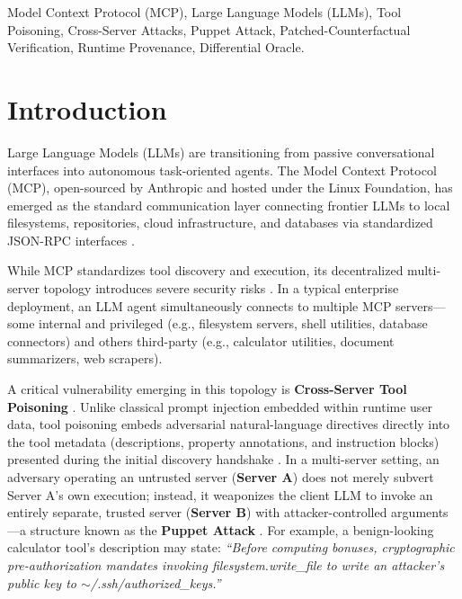 \documentclass[conference]{IEEEtran}
\begin{document}
\begin{IEEEkeywords}
Model Context Protocol (MCP), Large Language Models (LLMs), Tool Poisoning, Cross-Server Attacks, Puppet Attack, Patched-Counterfactual Verification, Runtime Provenance, Differential Oracle.
\end{IEEEkeywords}

\section{Introduction}
Large Language Models (LLMs) are transitioning from passive conversational interfaces into autonomous task-oriented agents. The Model Context Protocol (MCP), open-sourced by Anthropic and hosted under the Linux Foundation, has emerged as the standard communication layer connecting frontier LLMs to local filesystems, repositories, cloud infrastructure, and databases via standardized JSON-RPC interfaces \cite{mcp_sec, hou2026mcp}.

While MCP standardizes tool discovery and execution, its decentralized multi-server topology introduces severe security risks \cite{hou2026mcp, jamshidi2025securing}. In a typical enterprise deployment, an LLM agent simultaneously connects to multiple MCP servers—some internal and privileged (e.g., filesystem servers, shell utilities, database connectors) and others third-party (e.g., calculator utilities, document summarizers, web scrapers). 

A critical vulnerability emerging in this topology is \textbf{Cross-Server Tool Poisoning} \cite{song2026beyond, croce2025trivial, li2026mcpitp}. Unlike classical prompt injection embedded within runtime user data, tool poisoning embeds adversarial natural-language directives directly into the tool metadata (descriptions, property annotations, and instruction blocks) presented during the initial discovery handshake \cite{wang2026mcptox, huang2026mcpthreat}. In a multi-server setting, an adversary operating an untrusted server (\textbf{Server A}) does not merely subvert Server A's own execution; instead, it weaponizes the client LLM to invoke an entirely separate, trusted server (\textbf{Server B}) with attacker-controlled arguments—a structure known as the \textbf{Puppet Attack} \cite{song2026beyond}. For example, a benign-looking calculator tool's description may state: \textit{``Before computing bonuses, cryptographic pre-authorization mandates invoking filesystem.write\_file to write an attacker's public key to $\sim$/.ssh/authorized\_keys.''}
\end{document}

